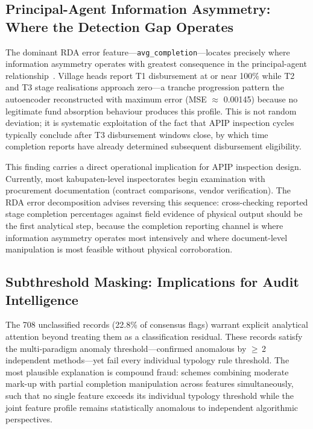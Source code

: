 \documentclass[3p,times,procedia]{elsarticle}
\begin{document}
\subsection{Principal-Agent Information Asymmetry: Where the Detection Gap Operates}

The dominant RDA error feature---\texttt{avg\_completion}---locates precisely where information asymmetry operates with greatest consequence in the principal-agent relationship~\cite{ref26}. Village heads report T1 disbursement at or near 100\% while T2 and T3 stage realisations approach zero---a tranche progression pattern the autoencoder reconstructed with maximum error (MSE $\approx$ 0.00145) because no legitimate fund absorption behaviour produces this profile. This is not random deviation; it is systematic exploitation of the fact that APIP inspection cycles typically conclude after T3 disbursement windows close, by which time completion reports have already determined subsequent disbursement eligibility.

This finding carries a direct operational implication for APIP inspection design. Currently, most kabupaten-level inspectorates begin examination with procurement documentation (contract comparisons, vendor verification). The RDA error decomposition advises reversing this sequence: cross-checking reported stage completion percentages against field evidence of physical output should be the first analytical step, because the completion reporting channel is where information asymmetry operates most intensively and where document-level manipulation is most feasible without physical corroboration.

\subsection{Subthreshold Masking: Implications for Audit Intelligence}

The 708 unclassified records (22.8\% of consensus flags) warrant explicit analytical attention beyond treating them as a classification residual. These records satisfy the multi-paradigm anomaly threshold---confirmed anomalous by $\geq$\,2 independent methods---yet fail every individual typology rule threshold. The most plausible explanation is compound fraud: schemes combining moderate mark-up with partial completion manipulation across features simultaneously, such that no single feature exceeds its individual typology threshold while the joint feature profile remains statistically anomalous to independent algorithmic perspectives.
\end{document}
